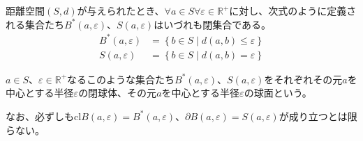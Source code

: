 \documentclass[dvipdfmx]{jsarticle}
\begin{document}
\begin{thm}\label{8.2.1.10}
距離空間$(S,d)$が与えられたとき、$\forall a \in S\forall\varepsilon \in \mathbb{R}^{+}$に対し、次式のように定義される集合たち$B^{*}(a,\varepsilon)$、$S(a,\varepsilon)$はいづれも閉集合である。
\begin{align*}
B^{*}(a,\varepsilon) &= \left\{ b \in S \middle| d(a,b) \leq \varepsilon \right\}\\
S(a,\varepsilon) &= \left\{ b \in S \middle| d(a,b) = \varepsilon \right\}
\end{align*}
\end{thm}
\begin{dfn}
$a \in S$、$\varepsilon \in \mathbb{R}^{+}$なるこのような集合たち$B^{*}(a,\varepsilon)$、$S(a,\varepsilon)$をそれぞれその元$a$を中心とする半径$\varepsilon$の閉球体、その元$a$を中心とする半径$\varepsilon$の球面という。
\end{dfn}\par
なお、必ずしも${\mathrm{cl}}{B(a,\varepsilon)} = B^{*}(a,\varepsilon)$、$\partial B(a,\varepsilon) = S(a,\varepsilon)$が成り立つとは限らない。
\end{document}

